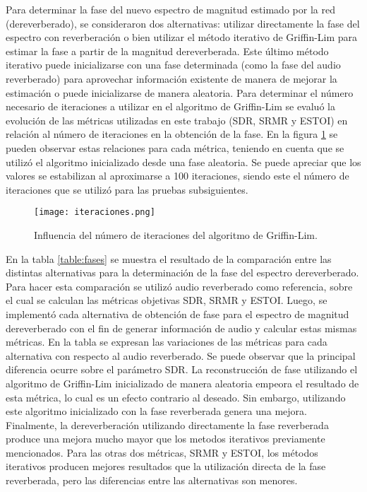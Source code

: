 Para determinar la fase del nuevo espectro de magnitud estimado por la red (dereverberado), se consideraron dos alternativas: utilizar directamente la fase del espectro con reverberación o bien utilizar el método iterativo de Griffin-Lim para estimar la fase a partir de la magnitud dereverberada. Este último método iterativo puede inicializarse con una fase determinada (como la fase del audio reverberado) para aprovechar información existente de manera de mejorar la estimación o puede inicializarse de manera aleatoria. 
Para determinar el número necesario de iteraciones a utilizar en el algoritmo de Griffin-Lim se evaluó la evolución de las métricas utilizadas en este trabajo (SDR, SRMR y ESTOI) en relación al número de iteraciones en la obtención de la fase. En la figura \ref{fig:iteraciones} se pueden observar estas relaciones para cada métrica, teniendo en cuenta que se utilizó el algoritmo inicializado desde una fase aleatoria. Se puede apreciar que los valores se estabilizan al aproximarse a 100 iteraciones, siendo este el número de iteraciones que se utilizó para las pruebas subsiguientes.     

\begin{figure}[H]
	\centering{}
	\texttt{[image: iteraciones.png]}
	\caption{Influencia del número de iteraciones del algoritmo de Griffin-Lim.}
	\label{fig:iteraciones}
\end{figure}

En la tabla \ref{table:fases} se muestra el resultado de la comparación entre las distintas alternativas para la determinación de la fase del espectro dereverberado. Para hacer esta comparación se utilizó audio reverberado como referencia, sobre el cual se calculan las métricas objetivas SDR, SRMR y ESTOI. Luego, se implementó cada alternativa de obtención de fase para el espectro de magnitud dereverberado con el fin de generar información de audio y calcular estas mismas métricas. En la tabla se expresan las variaciones de las métricas para cada alternativa con respecto al audio reverberado. Se puede observar que la principal diferencia ocurre sobre el parámetro SDR. La reconstrucción de fase utilizando el algoritmo de Griffin-Lim inicializado de manera aleatoria empeora el resultado de esta métrica, lo cual es un efecto contrario al deseado. Sin embargo, utilizando este algoritmo inicializado con la fase reverberada genera una mejora. Finalmente, la dereverberación utilizando directamente la fase reverberada produce una mejora mucho mayor que los metodos iterativos previamente mencionados. Para las otras dos métricas, SRMR y ESTOI, los métodos iterativos producen mejores resultados que la utilización directa de la fase reverberada, pero las diferencias entre las alternativas son menores.

